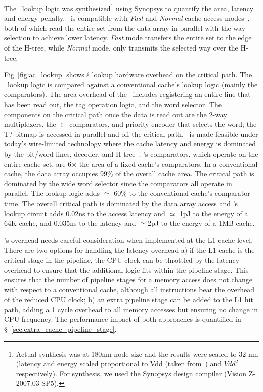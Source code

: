 

The \AC\ lookup logic was synthesized\footnote{Actual synthesis was at 180nm node size and the results were scaled to 32 nm (latency and energy scaled proportional to Vdd (taken from~\cite{Danowitz:2012:CDR:2133806.2133822}) and $Vdd^2$ respectively). For synthesis, we used the Synopsys design compiler (Vision Z-2007.03-SP5).} using Synopsys to quantify the area, latency and energy penalty. \AC\ is compatible with  \textit{Fast} and \textit{Normal} cache access modes~\cite{Muralimanohar:2007:ONO:1331699.1331704}, both of which read the entire set from the data array in parallel with the way selection to  achieve lower latency. \textit{Fast} mode transfers the entire set to the edge of the H-tree, while \textit{Normal} mode, only transmits the selected way over the H-tree. 

Fig~\ref{fig:ac_lookup} shows \AC\'s lookup hardware overhead on the critical path. The \AC\ lookup logic is compared against a conventional cache's lookup logic (mainly the comparators). The area overhead of the \AC\ includes registering an entire line that has been read out, the tag operation logic, and the word selector. The components on the critical path once the data is read out are the 2-way multiplexers, the $\in$ comparators, and priority encoder that selects the word; the T?  bitmap is accessed in parallel and off the critical path. \AC\ is made feasible under today's wire-limited technology where the cache latency and energy is dominated by the bit/word lines, decoder, and H-tree~\cite{Muralimanohar:2007:ONO:1331699.1331704}. \AC{}'s comparators, which operate on the entire cache set, are 6$\times$ the area of a fixed cache's comparators. In a conventional cache, the data array occupies 99\% of the overall cache area. The critical path is dominated by the wide word selector since the comparators all operate in parallel. The lookup logic adds $\simeq$ 60\% to the conventional cache's comparator time. The overall critical path is dominated by the data array access and \AC{}'s lookup circuit adds 0.02ns to the access latency and $\simeq$ 1pJ to the energy of a 64K cache, and 0.035ns to the latency and $\simeq$2pJ to the energy of a 1MB cache. 

\AC{}'s overhead needs careful consideration when implemented at the L1 cache level. There are two options for handling the latency overhead a) if the L1 cache is the critical stage in the pipeline, the CPU clock can be throttled by the latency overhead to ensure that the additional logic fits within the pipeline stage. This ensures that the number of pipeline stages for a memory access does not change with respect to a conventional cache, although all instructions bear the overhead of the reduced CPU clock; b) an extra pipeline stage can be added to the L1 hit path, adding a 1 cycle overhead to all memory accesses but ensuring no change in CPU frequency. The performance impact of both approaches is quantified in \S~\ref{sec:extra_cache_pipeline_stage}.


